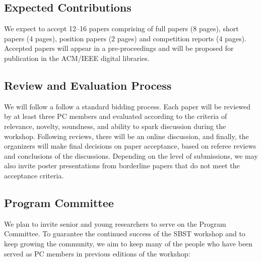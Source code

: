 \documentclass[10pt,conference]{IEEEtran}
\begin{document}
\subsection{Expected Contributions}

We expect to accept 12--16 papers comprising of full papers (8 pages),
short papers (4 pages), position papers (2 pages) and competition
reports (4 pages).  Accepted papers will appear in a pre-proceedings
and will be proposed for publication in the ACM/IEEE digital
libraries.

\subsection{Review and Evaluation Process}

We will follow a follow a standard bidding process. Each paper will be
reviewed by at least three PC members and evaluated according to the
criteria of relevance, novelty, soundness, and ability to spark
discussion during the workshop. Following reviews, there will be an
online discussion, and finally, the organizers will make final
decisions on paper acceptance, based on referee reviews and
conclusions of the discussions. Depending on the level of submissions,
we may also invite poster presentations from borderline papers that do
not meet the acceptance criteria.


\subsection{Program Committee}

We plan to invite senior and young researchers to serve on the Program
Committee. To guarantee the continued success of the SBST workshop and
to keep growing the community, we aim to keep many of the people who
have been served as PC members in previous editions of the workshop:
\end{document}
